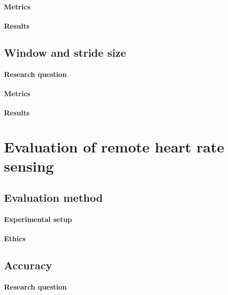 \paragraph{Metrics}
\paragraph{Results}
%

\subsection{Window and stride size}
\paragraph{Research question}
\paragraph{Metrics}
\paragraph{Results}


\section{Evaluation of remote heart rate sensing}
\subsection{Evaluation method}
\paragraph{Experimental setup}
\paragraph{Ethics}
\subsection{Accuracy}

\paragraph{Research question}
